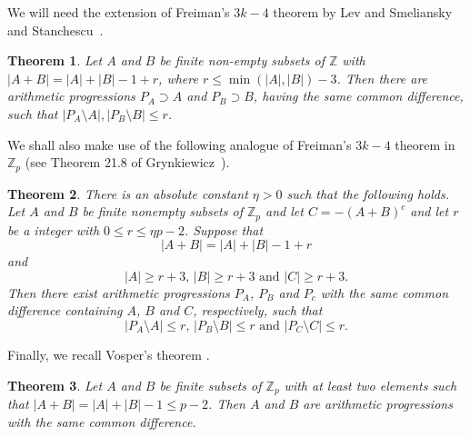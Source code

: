 \documentclass[12pt,reqno]{amsart}
\newtheorem{theorem}{Theorem}
\theoremstyle{definition}
\renewcommand\leq{\leqslant}
\renewcommand\geq{\geqslant}
\begin{document}
\vspace{5pt}
We will need the extension of Freiman's $3k-4$ theorem \cite{Frei-59,Frei-62} by Lev and
Smeliansky~\cite{LevSme} and Stanchescu~\cite{Stan}.

\begin{theorem}\label{3k-4}
Let $A$ and $B$ be finite non-empty subsets of ${\mathbb Z}$ with $|A+B|=|A|+|B|-1+r$, where
$r \leq \min(|A|,|B|)-3$. Then there are arithmetic progressions $P_A \supset A$ and $P_B \supset B$,
having the same common difference, such that $|P_A \setminus A|,|P_B \setminus B| \leq r$.
\end{theorem}

\vspace{5pt}
We shall also make use of the following analogue of Freiman's $3k-4$ theorem in $\mathbb{Z}_p$
(see Theorem 21.8 of Grynkiewicz~\cite{grynkiewicz-2}).

\begin{theorem}\label{3k-4_Z_p}
There is an absolute constant $\eta >0$ such that the following holds. Let $A$ and $B$ be finite nonempty subsets of $\mathbb{Z}_p$ and let $C=-(A+B)^c$ and let $r$ be a integer with $0\leq r \leq \eta p-2$. Suppose that $$|A+B|=|A|+|B|-1+r$$
and $$|A|\geq r+3 \text{, } |B|\geq r+3 \text{ and } |C|\geq r+3.$$
Then there exist arithmetic progressions $P_A$, $P_B$ and $P_c$ with the same common difference containing $A$, $B$ and $C$, respectively, such that
$$|P_A\setminus A|\leq r \text{, } |P_B \setminus B|\leq r \text{ and } |P_C \setminus C|\leq r.$$
\end{theorem}

\vspace{5pt}
Finally, we recall Vosper's theorem  \cite{Vosp1, Vosp2}.
\begin{theorem}\label{vosper}
Let $A$ and $B$ be finite subsets of $\mathbb{Z}_p$ with at least two elements such that $|A+B| = |A|+|B|-1 \leq p-2$. Then $A$ and $B$ are arithmetic progressions with the same common difference.
\end{theorem}


\end{document}
